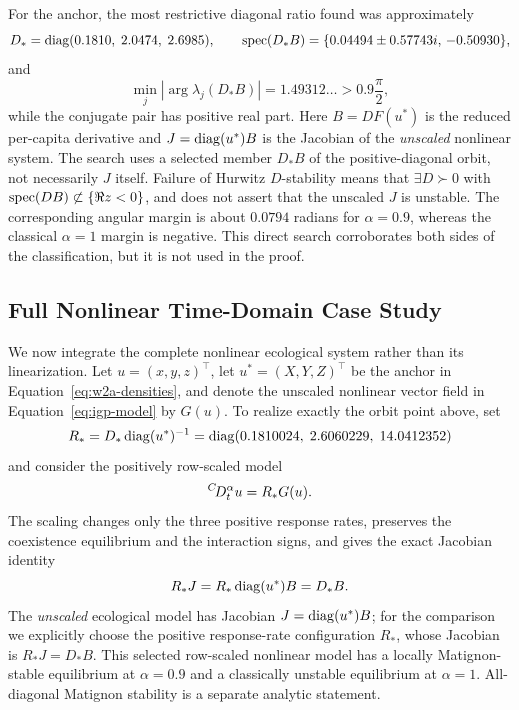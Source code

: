 For the anchor, the most restrictive diagonal ratio found was approximately
\[
 D_*=\operatorname{diag}(0.1810,\;2.0474,\;2.6985),
 \qquad
 \operatorname{spec}(D_*B)=\{0.04494\pm0.57743i,\,-0.50930\},
\]
and
\[
 \min_j|\arg\lambda_j(D_*B)|=1.49312\ldots>0.9\frac{\pi}{2},
\]
while the conjugate pair has positive real part. Here \(B=DF(u^*)\) is the reduced per-capita derivative and \(J=\operatorname{diag}(u^*)B\) is the Jacobian of the \emph{unscaled} nonlinear system. The search uses a selected member \(D_*B\) of the positive-diagonal orbit, not necessarily \(J\) itself. Failure of Hurwitz \(D\)-stability means that \(\exists D\succ0\) with \(\operatorname{spec}(DB)\not\subset\{\Re z<0\}\), and does not assert that the unscaled \(J\) is unstable. The corresponding angular margin is about \(0.0794\) radians for \(\alpha=0.9\), whereas the classical \(\alpha=1\) margin is negative. This direct search corroborates both sides of the classification, but it is not used in the proof.

\subsection{Full Nonlinear Time-Domain Case Study}

We now integrate the complete nonlinear ecological system rather than its linearization. Let \(u=(x,y,z)^\top\), let \(u^*=(X,Y,Z)^\top\) be the anchor in Equation~\eqref{eq:w2a-densities}, and denote the unscaled nonlinear vector field in Equation~\eqref{eq:igp-model} by \(G(u)\). To realize exactly the orbit point above, set
\begin{equation}
 R_*=D_*\operatorname{diag}(u^*)^{-1}
 =\operatorname{diag}(0.1810024,\;2.6060229,\;14.0412352)
 \label{eq:row-rate-scaling}
\end{equation}
and consider the positively row-scaled model
\begin{equation}
 {}^{C}\!D_t^{\alpha}u=R_*G(u).
 \label{eq:scaled-nonlinear-case}
\end{equation}
The scaling changes only the three positive response rates, preserves the coexistence equilibrium and the interaction signs, and gives the exact Jacobian identity
\[
 R_*J=R_*\operatorname{diag}(u^*)B=D_*B.
\]
The \emph{unscaled} ecological model has Jacobian \(J=\operatorname{diag}(u^*)B\); for the comparison we explicitly choose the positive response-rate configuration \(R_*\), whose Jacobian is \(R_*J=D_*B\). This selected row-scaled nonlinear model has a locally Matignon-stable equilibrium at \(\alpha=0.9\) and a classically unstable equilibrium at \(\alpha=1\). All-diagonal Matignon stability is a separate analytic statement.

